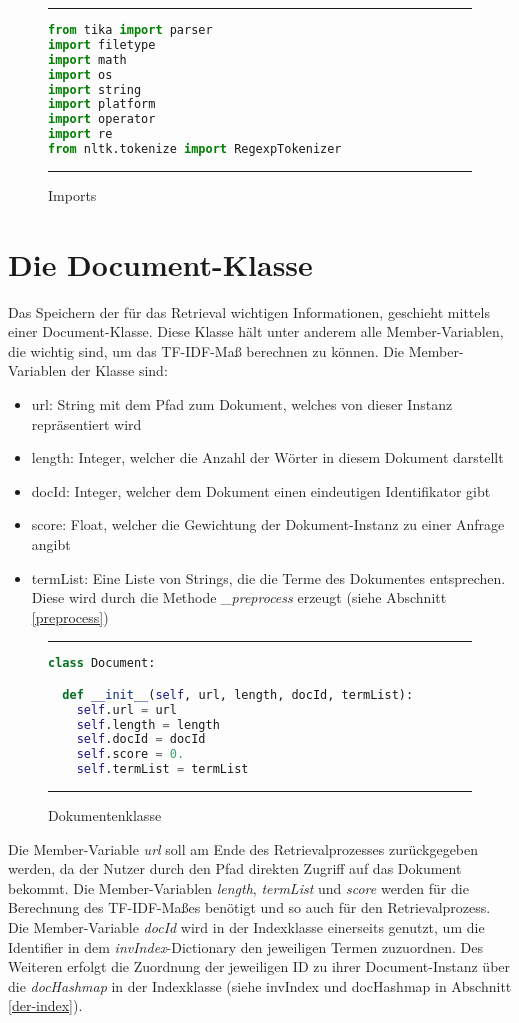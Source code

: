\begin{figure}
	\rule{\textwidth}{0.4pt}
		\begin{lstlisting}[language=Python]
from tika import parser
import filetype
import math
import os
import string
import platform
import operator
import re
from nltk.tokenize import RegexpTokenizer
		\end{lstlisting}
	\rule{\textwidth}{0.4pt}
	\caption{Imports}
	\label{fig:import}
\end{figure}

\section{Die Document-Klasse}\label{die-document-klasse}

Das Speichern der für das Retrieval wichtigen Informationen, geschieht mittels einer Document-Klasse. Diese Klasse hält unter anderem alle Member-Variablen, die wichtig sind, um das TF-IDF-Maß berechnen zu können. Die Member-Variablen der Klasse sind:
\begin{itemize}
	\item url: String mit dem Pfad zum Dokument, welches von dieser Instanz repräsentiert wird
	\item length: Integer, welcher die Anzahl der Wörter in diesem Dokument darstellt
	\item docId: Integer, welcher dem Dokument einen eindeutigen Identifikator gibt
	\item score: Float, welcher die Gewichtung der Dokument-Instanz zu einer Anfrage angibt
	\item termList: Eine Liste von Strings, die die Terme des Dokumentes entsprechen. Diese wird durch die Methode \textit{\_preprocess} erzeugt (siehe Abschnitt \ref{preprocess})
\end{itemize} 

\begin{figure}
	\rule{\textwidth}{0.4pt}
		\begin{lstlisting}[language=Python]
class Document:

  def __init__(self, url, length, docId, termList):
    self.url = url
    self.length = length
    self.docId = docId
    self.score = 0.
    self.termList = termList
		\end{lstlisting}
	\rule{\textwidth}{0.4pt}
	\caption{Dokumentenklasse}
	\label{fig:document}
\end{figure}

Die Member-Variable \textit{url} soll am Ende des Retrievalprozesses zurückgegeben werden, da der Nutzer durch den Pfad direkten Zugriff auf das Dokument bekommt. Die Member-Variablen \textit{length}, \textit{termList} und \textit{score} werden für die Berechnung des TF-IDF-Maßes benötigt und so auch für den Retrievalprozess. Die Member-Variable \textit{docId} wird in der Indexklasse einerseits genutzt, um die Identifier in dem \textit{invIndex}-Dictionary den jeweiligen Termen zuzuordnen. Des Weiteren erfolgt die Zuordnung der jeweiligen ID zu ihrer Document-Instanz über die \textit{docHashmap} in der Indexklasse (siehe invIndex und docHashmap in Abschnitt \ref{der-index}).

